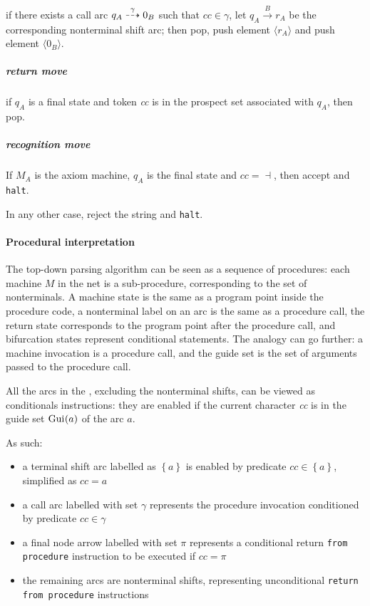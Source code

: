 \documentclass[english]{article}
\begin{document}
if there exists a call arc \(q_A \stackrel{\gamma}{\dashrightarrow} 0_B\) such that \(\textit{cc} \in \gamma\), let \(q_A \xrightarrow{B} r_A\) be the corresponding nonterminal shift arc;
then pop, push element \(\langle r_A \rangle\) and push element \(\langle 0_B \rangle\).

\subparagraph*{return move}

if \(q_A\) is a final state and token \textit{cc} is in the prospect set associated with \(q_A\), then pop.

\subparagraph*{recognition move}

If \(M_A\) is the axiom machine, \(q_A\) is the final state and \(\textit{cc} = \dashv\), then accept and \texttt{halt}.

In any other case, reject the string and \texttt{halt}.

\paragraph{Procedural interpretation}

The top-down parsing algorithm can be seen as a sequence of procedures:
each machine \(M\) in the net is a sub-procedure, corresponding to the set of nonterminals.
A machine state is the same as a program point inside the procedure code, a nonterminal label on an arc is the same as a procedure call, the return state corresponds to the program point after the procedure call, and bifurcation states represent conditional statements.
The analogy can go further: a machine invocation is a procedure call, and the guide set is the set of arguments passed to the procedure call.

\bigskip
All the arcs in the \PCFG, excluding the nonterminal shifts, can be viewed as conditionals instructions:
they are enabled if the current character \textit{cc} is in the guide set \(\text{Gui}\hspace{0.1ex}(a)\) of the arc \(a\).

As such:

\begin{itemize}
  \item a terminal shift arc labelled as \(\left\{ a \right\}\) is enabled by predicate \(\textit{cc} \in \left\{ a \right\}\), simplified as \(\textit{cc}=a\)
  \item a call arc labelled with set \(\gamma\) represents the procedure invocation conditioned by predicate \(\textit{cc} \in \gamma\)
  \item a final node arrow labelled with set \(\pi\) represents a conditional return \texttt{from procedure} instruction to be executed if \(\textit{cc}=\pi\)
  \item the remaining \PCFG arcs are nonterminal shifts, representing unconditional \texttt{return from procedure} instructions
\end{itemize}
\end{document}
